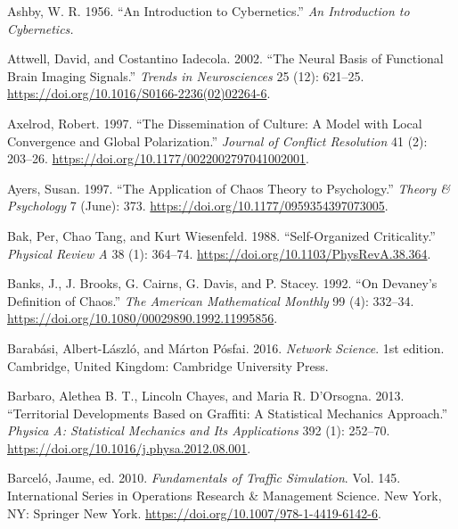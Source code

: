 \documentclass[
  a4paper,
  DIV=11,
  numbers=noendperiod,
  oneside]{scrreprt}
\newlength{\cslhangindent}
\newenvironment{CSLReferences}[2] %
 {\begin{list}{}{%
  \setlength{\itemindent}{0pt}
  \setlength{\leftmargin}{0pt}
  \setlength{\parsep}{0pt}
  \ifodd #1
   \setlength{\leftmargin}{\cslhangindent}
   \setlength{\itemindent}{-1\cslhangindent}
  \fi
  \setlength{\itemsep}{#2\baselineskip}}}
 {\end{list}}
\begin{document}
\begin{CSLReferences}{1}{0}
Ashby, W. R. 1956. {``An Introduction to Cybernetics.''} \emph{An
Introduction to Cybernetics.}

Attwell, David, and Costantino Iadecola. 2002. {``The Neural Basis of
Functional Brain Imaging Signals.''} \emph{Trends in Neurosciences} 25
(12): 621--25. \url{https://doi.org/10.1016/S0166-2236(02)02264-6}.

Axelrod, Robert. 1997. {``The {Dissemination} of {Culture}: {A Model}
with {Local Convergence} and {Global Polarization}.''} \emph{Journal of
Conflict Resolution} 41 (2): 203--26.
\url{https://doi.org/10.1177/0022002797041002001}.

Ayers, Susan. 1997. {``The {Application} of {Chaos Theory} to
{Psychology}.''} \emph{Theory \& Psychology} 7 (June): 373.
\url{https://doi.org/10.1177/0959354397073005}.

Bak, Per, Chao Tang, and Kurt Wiesenfeld. 1988. {``Self-Organized
Criticality.''} \emph{Physical Review A} 38 (1): 364--74.
\url{https://doi.org/10.1103/PhysRevA.38.364}.

Banks, J., J. Brooks, G. Cairns, G. Davis, and P. Stacey. 1992. {``On
{Devaney}'s {Definition} of {Chaos}.''} \emph{The American Mathematical
Monthly} 99 (4): 332--34.
\url{https://doi.org/10.1080/00029890.1992.11995856}.

Barabási, Albert-László, and Márton Pósfai. 2016. \emph{Network
{Science}}. 1st edition. {Cambridge, United Kingdom}: {Cambridge
University Press}.

Barbaro, Alethea B. T., Lincoln Chayes, and Maria R. D'Orsogna. 2013.
{``Territorial Developments Based on Graffiti: {A} Statistical Mechanics
Approach.''} \emph{Physica A: Statistical Mechanics and Its
Applications} 392 (1): 252--70.
\url{https://doi.org/10.1016/j.physa.2012.08.001}.

Barceló, Jaume, ed. 2010. \emph{Fundamentals of {Traffic Simulation}}.
Vol. 145. International {Series} in {Operations Research} \& {Management
Science}. {New York, NY}: {Springer New York}.
\url{https://doi.org/10.1007/978-1-4419-6142-6}.


\end{CSLReferences}
\end{document}
